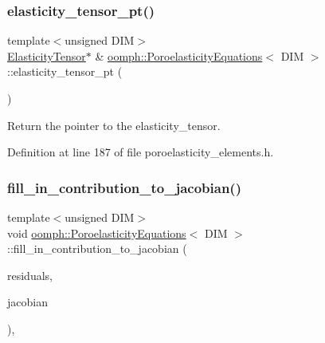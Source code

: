 \subsubsection{\texorpdfstring{elasticity\+\_\+tensor\+\_\+pt()}{elasticity\_tensor\_pt()}}
{\footnotesize\ttfamily template$<$unsigned D\+IM$>$ \\
\hyperlink{classoomph_1_1ElasticityTensor}{Elasticity\+Tensor}$\ast$ \& \hyperlink{classoomph_1_1PoroelasticityEquations}{oomph\+::\+Poroelasticity\+Equations}$<$ D\+IM $>$\+::elasticity\+\_\+tensor\+\_\+pt (\begin{DoxyParamCaption}{ }\end{DoxyParamCaption})\hspace{0.3cm}{\ttfamily [inline]}}



Return the pointer to the elasticity\+\_\+tensor. 



Definition at line 187 of file poroelasticity\+\_\+elements.\+h.

\mbox{\label{classoomph_1_1PoroelasticityEquations_a80054aa3b3eb9310430b2c50d45acdda}} 
\subsubsection{\texorpdfstring{fill\+\_\+in\+\_\+contribution\+\_\+to\+\_\+jacobian()}{fill\_in\_contribution\_to\_jacobian()}}
{\footnotesize\ttfamily template$<$unsigned D\+IM$>$ \\
void \hyperlink{classoomph_1_1PoroelasticityEquations}{oomph\+::\+Poroelasticity\+Equations}$<$ D\+IM $>$\+::fill\+\_\+in\+\_\+contribution\+\_\+to\+\_\+jacobian (\begin{DoxyParamCaption}\item[{\hyperlink{classoomph_1_1Vector}{Vector}$<$ double $>$ \&}]{residuals,  }\item[{\hyperlink{classoomph_1_1DenseMatrix}{Dense\+Matrix}$<$ double $>$ \&}]{jacobian }\end{DoxyParamCaption})\hspace{0.3cm}{\ttfamily [inline]}, {\ttfamily [virtual]}}



